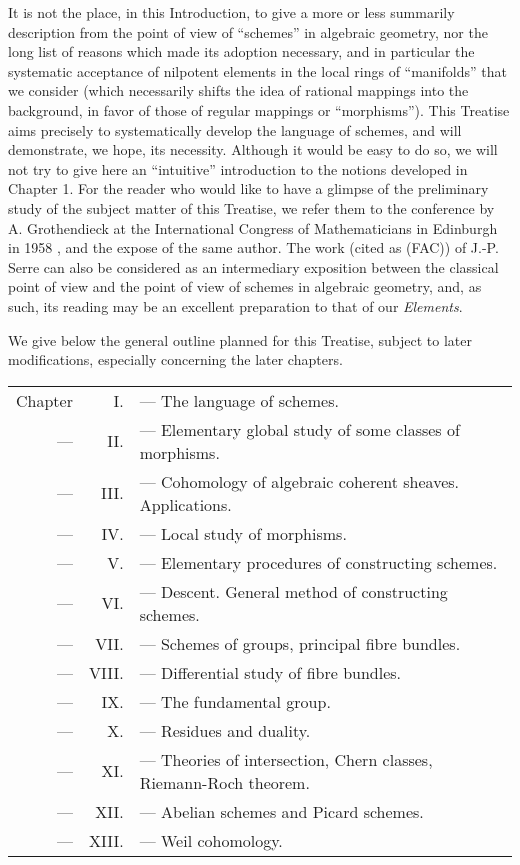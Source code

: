 It is not the place, in this Introduction, to give a more or less summarily
description from the point of view of ``schemes'' in algebraic geometry, nor the
long list of reasons which made its adoption necessary, and in particular the
systematic acceptance of nilpotent elements in the local rings of ``manifolds''
that we consider (which necessarily shifts the idea of rational mappings into
the background, in favor of those of regular mappings or ``morphisms''). This
Treatise aims precisely to systematically develop the language of schemes, and
will demonstrate, we hope, its necessity. Although it would be easy to do so,
we will not try to give here an ``intuitive'' introduction to the
notions developed in Chapter 1. For the reader who would like to have a glimpse
of the preliminary study of the subject matter of this Treatise, we refer them
to the conference by A. Grothendieck at the International Congress of
Mathematicians in Edinburgh in 1958 \cite{7}, and the expose \cite{8} of the
same author. The work \cite{14} (cited as (FAC)) of J.-P. Serre can also be
considered as an intermediary exposition between the classical point of view and
the point of view of schemes in algebraic geometry, and, as such, its reading
may be an excellent preparation to that of our \emph{Elements}.

\asttri

We give below the general outline planned for this Treatise, subject to later
modifications, especially concerning the later chapters.

\begin{tabular}{rrl}
Chapter & I. & --- The language of schemes.\\
--- & II. & --- Elementary global study of some classes of morphisms.\\
--- & III. & --- Cohomology of algebraic coherent sheaves. Applications.\\
--- & IV. & --- Local study of morphisms.\\
--- & V. & --- Elementary procedures of constructing schemes.\\
--- & VI. & --- Descent. General method of constructing schemes.\\
--- & VII. & --- Schemes of groups, principal fibre bundles.\\
--- & VIII. & --- Differential study of fibre bundles.\\
--- & IX. & --- The fundamental group.\\
--- & X. & --- Residues and duality.\\
--- & XI. & --- Theories of intersection, Chern classes, Riemann-Roch theorem.\\
--- & XII. & --- Abelian schemes and Picard schemes.\\
--- & XIII. & --- Weil cohomology.
\end{tabular}\\

